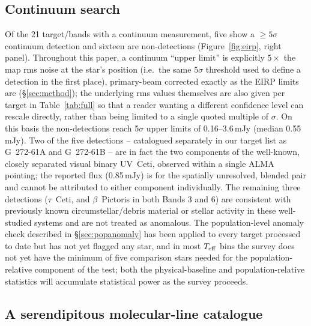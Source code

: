 \documentclass{openjournal}
\begin{document}
\subsection{Continuum search}

Of the 21 target/bands with a continuum measurement, five show a
$\geq5\sigma$ continuum detection and sixteen are non-detections
(Figure~\ref{fig:eirp}, right panel). Throughout this paper, a continuum
``upper limit'' is explicitly $5\times$ the map rms noise at the star's
position (i.e.\ the same $5\sigma$ threshold used to define a detection
in the first place), primary-beam corrected exactly as the EIRP limits
are (\S\ref{sec:method}); the underlying rms values themselves are also
given per target in Table~\ref{tab:full} so that a reader wanting a
different confidence level can rescale directly, rather than being
limited to a single quoted multiple of $\sigma$. On this basis the
non-detections reach 5$\sigma$ upper limits of 0.16--3.6\,mJy (median
0.55\,mJy). Two of the five detections -- catalogued separately in our
target list as G~272-61A and G~272-61B -- are in fact the two components
of the well-known, closely separated visual binary UV~Ceti, observed
within a single ALMA pointing; the reported flux (0.85\,mJy) is for the
spatially unresolved, blended pair and cannot be attributed to either
component individually. The remaining three detections ($\tau$~Ceti, and
$\beta$~Pictoris in both Bands 3 and 6) are consistent with previously
known circumstellar/debris material or stellar activity in these
well-studied systems and are not treated as anomalous. The population-level anomaly check described in
\S\ref{sec:popanomaly} has been applied to every target processed to
date but has not yet flagged any star, and in most $T_{\rm eff}$ bins the
survey does not yet have the minimum of five comparison stars needed for
the population-relative component of the test; both the physical-baseline
and population-relative statistics will accumulate statistical power as
the survey proceeds.

\subsection{A serendipitous molecular-line catalogue}
\label{sec:linecatalogue}
\end{document}
